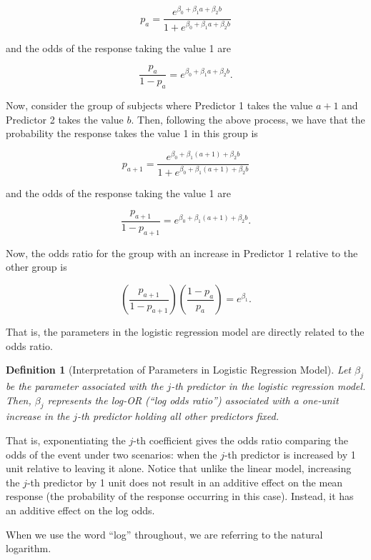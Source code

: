 \documentclass[
]{book}
\theoremstyle{plain}
\theoremstyle{mydefn}
\newtheorem{definition}{Definition}[chapter]
\theoremstyle{myexmpl}
\theoremstyle{remark}
\begin{document}
\[p_a = \frac{e^{\beta_0 + \beta_1 a + \beta_2 b}}{1 + e^{\beta_0 + \beta_1 a + \beta_2 b}}\]

and the odds of the response taking the value 1 are

\[\frac{p_a}{1 - p_a} = e^{\beta_0 + \beta_1 a + \beta_2 b}.\]

Now, consider the group of subjects where Predictor 1 takes the value \(a + 1\) and Predictor 2 takes the value \(b\). Then, following the above process, we have that the probability the response takes the value 1 in this group is

\[p_{a+1} = \frac{e^{\beta_0 + \beta_1 (a + 1) + \beta_2 b}}{1 + e^{\beta_0 + \beta_1 (a + 1)+ \beta_2 b}}\]

and the odds of the response taking the value 1 are

\[\frac{p_{a+1}}{1 - p_{a+1}} = e^{\beta_0 + \beta_1 (a + 1) + \beta_2 b}.\]

Now, the odds ratio for the group with an increase in Predictor 1 relative to the other group is

\[\left(\frac{p_{a+1}}{1 - p_{a+1}}\right) \left(\frac{1 - p_a}{p_a}\right) = e^{\beta_1}.\]

That is, the parameters in the logistic regression model are directly related to the odds ratio.

\begin{definition}[Interpretation of Parameters in Logistic Regression Model]
\protect\hypertarget{def:defn-logistic-interpretation}{}{\label{def:defn-logistic-interpretation} {} }Let \(\beta_j\) be the parameter associated with the \(j\)-th predictor in the logistic regression model. Then, \(\beta_j\) represents the log-OR (``log odds ratio'') associated with a one-unit increase in the \(j\)-th predictor holding all other predictors fixed.
\end{definition}

That is, exponentiating the \(j\)-th coefficient gives the odds ratio comparing the odds of the event under two scenarios: when the \(j\)-th predictor is increased by 1 unit relative to leaving it alone. Notice that unlike the linear model, increasing the \(j\)-th predictor by 1 unit does not result in an additive effect on the mean response (the probability of the response occurring in this case). Instead, it has an additive effect on the log odds.

\begin{rmdtip}
When we use the word ``log'' throughout, we are referring to the natural logarithm.
\end{rmdtip}
\end{document}
